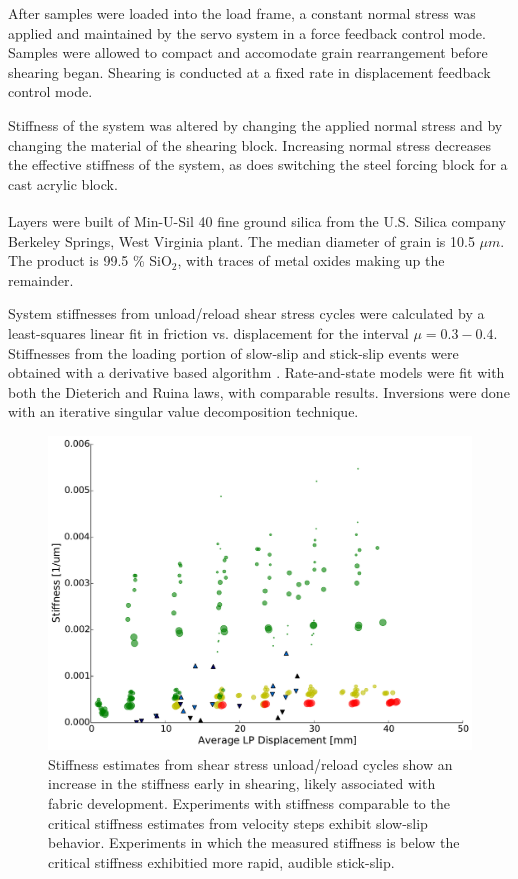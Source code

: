 \documentclass[11pt]{article}
\begin{document}
After samples were loaded into the load frame, a constant normal stress was
applied and maintained by the servo system in a force feedback control mode.
Samples were allowed to compact and accomodate grain rearrangement before
shearing began. Shearing is conducted at a fixed rate in displacement feedback
control mode.

Stiffness of the system was altered by changing the applied normal stress and by
changing the material of the shearing block. Increasing normal stress decreases
the effective stiffness of the system, as does switching the steel forcing block
for a cast acrylic block.

Layers were built of Min-U-Sil\textsuperscript{\textregistered} 40 fine ground
silica from the U.S. Silica\textsuperscript{\textregistered} company Berkeley
Springs, West Virginia plant. The median diameter of grain is 10.5 $\mu m$. The
product is 99.5 \% SiO$_2$, with traces of metal oxides making up the remainder.

System stiffnesses from unload/reload shear stress cycles were calculated by a
least-squares linear fit in friction vs. displacement for the interval $\mu =
0.3-0.4$. Stiffnesses from the loading portion of slow-slip and stick-slip
events were obtained with a derivative based algorithm \cite{Leeman:2015}.
Rate-and-state models were fit with both the Dieterich and
Ruina laws, with comparable results. Inversions were done with an iterative
singular value decomposition technique.

\begin{figure}
	\centering
		\includegraphics[scale=0.4]{../Figures/Fig_Stiffness_Evolution/Stiffness_Evolution.pdf}
   	\caption{Stiffness estimates from shear stress unload/reload cycles show
       an increase in the stiffness early in shearing, likely associated with
       fabric development. Experiments with stiffness comparable to the critical stiffness
       estimates from velocity steps exhibit slow-slip behavior. Experiments in
       which the measured stiffness is below the critical stiffness exhibitied
       more rapid, audible stick-slip.}
  	\label{Figure:Stiffness Evolution}
\end{figure}
\end{document}
